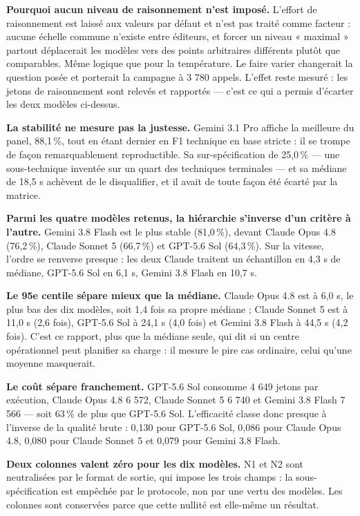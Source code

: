\textbf{Pourquoi aucun niveau de raisonnement n'est imposé.} L'effort de raisonnement est laissé aux valeurs par défaut et n'est pas traité comme facteur : aucune échelle commune n'existe entre éditeurs, et forcer un niveau « maximal » partout déplacerait les modèles vers des points arbitraires différents plutôt que comparables. Même logique que pour la température. Le faire varier changerait la question posée et porterait la campagne à 3 780 appels. L'effet reste mesuré : les jetons de raisonnement sont relevés et rapportés --- c'est ce qui a permis d'écarter les deux modèles ci-dessus.

\textbf{La stabilité ne mesure pas la justesse.} Gemini 3.1 Pro affiche la meilleure du panel, 88,1\,\%, tout en étant dernier en F1 technique en base stricte : il se trompe de façon remarquablement reproductible. Sa sur-spécification de 25,0\,\% --- une sous-technique inventée sur un quart des techniques terminales --- et sa médiane de 18,5 s achèvent de le disqualifier, et il avait de toute façon été écarté par la matrice.

\textbf{Parmi les quatre modèles retenus, la hiérarchie s'inverse d'un critère à l'autre.} Gemini 3.8 Flash est le plus stable (81,0\,\%), devant Claude Opus 4.8 (76,2\,\%), Claude Sonnet 5 (66,7\,\%) et GPT-5.6 Sol (64,3\,\%). Sur la vitesse, l'ordre se renverse presque : les deux Claude traitent un échantillon en 4,3 s de médiane, GPT-5.6 Sol en 6,1 s, Gemini 3.8 Flash en 10,7 s.

\textbf{Le 95e centile sépare mieux que la médiane.} Claude Opus 4.8 est à 6,0 s, le plus bas des dix modèles, soit 1,4 fois sa propre médiane ; Claude Sonnet 5 est à 11,0 s (2,6 fois), GPT-5.6 Sol à 24,1 s (4,0 fois) et Gemini 3.8 Flash à 44,5 s (4,2 fois). C'est ce rapport, plus que la médiane seule, qui dit si un centre opérationnel peut planifier sa charge : il mesure le pire cas ordinaire, celui qu'une moyenne masquerait.

\textbf{Le coût sépare franchement.} GPT-5.6 Sol consomme 4 649 jetons par exécution, Claude Opus 4.8 6 572, Claude Sonnet 5 6 740 et Gemini 3.8 Flash 7 566 --- soit 63\,\% de plus que GPT-5.6 Sol. L'efficacité classe donc presque à l'inverse de la qualité brute : 0,130 pour GPT-5.6 Sol, 0,086 pour Claude Opus 4.8, 0,080 pour Claude Sonnet 5 et 0,079 pour Gemini 3.8 Flash.

\textbf{Deux colonnes valent zéro pour les dix modèles.} N1 et N2 sont neutralisées par le format de sortie, qui impose les trois champs : la sous-spécification est empêchée par le protocole, non par une vertu des modèles. Les colonnes sont conservées parce que cette nullité est elle-même un résultat.

